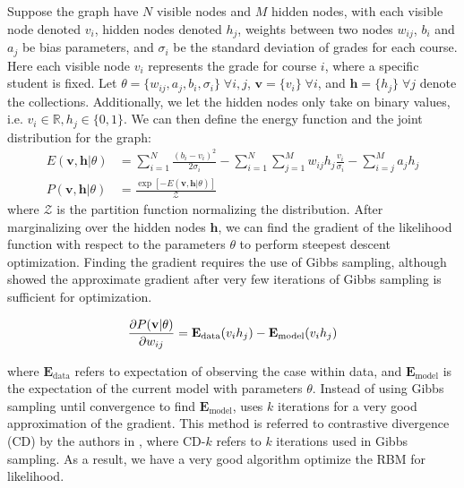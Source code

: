 Suppose the graph have $N$ visible nodes and $M$ hidden nodes,
with each visible node denoted $v_i$, hidden nodes denoted $h_j$, 
weights between two nodes $w_{ij}$,
$b_i$ and $a_j$ be bias parameters,
and $\sigma_i$ be the standard deviation of grades for each course.
Here each visible node $v_i$ represents the grade for course $i$,
where a specific student is fixed.
Let $\theta = \{ w_{ij},a_j,b_i,\sigma_i \} \; \forall i,j$,
$\mathbf{v} = \{v_i\} \; \forall i$,
and $\mathbf{h} = \{h_j\} \; \forall j$ denote the collections.
Additionally, we let the hidden nodes only take on binary values, 
i.e. $v_i \in \mathbb{R}, h_j \in \{0,1\}$.
We can then define the energy function and 
the joint distribution for the graph:
%
\begin{equation}
\begin{aligned}
    E(\mathbf{v},\mathbf{h}|\theta) &= 
        \displaystyle\sum_{i=1}^N \frac{(b_i - v_i)^2}{2 \sigma_i}
        - \displaystyle\sum_{i=1}^N \displaystyle\sum_{j=1}^M
             w_{ij} h_j \frac{v_i}{\sigma_i}
        - \displaystyle\sum_{i=j}^M a_j h_j \\
%
%
    P(\mathbf{v},\mathbf{h}|\theta) &= 
        \frac{\exp\left[-E(\mathbf{v},\mathbf{h}|\theta)\right]}
        {\mathcal{Z}}
\end{aligned}
\end{equation}
%
where $\mathcal{Z}$ is the partition function normalizing
the distribution.
After marginalizing over the hidden nodes $\mathbf{h}$, 
we can find the gradient of the likelihood function
with respect to the parameters $\theta$
to perform steepest descent optimization.
Finding the gradient requires the use of Gibbs sampling,
although \cite{SaMnHi07} showed the approximate gradient
after very few iterations of Gibbs sampling is sufficient 
for optimization.

\begin{equation}
    \frac{\partial P(\mathbf{v}|\theta)}{\partial w_{ij}} = 
        \mathbf{E}_{\text{data}} (v_i h_j) -
        \mathbf{E}_{\text{model}} (v_i h_j)
\end{equation}

where $\mathbf{E}_{\text{data}}$ refers to expectation 
of observing the case within data,
and $\mathbf{E}_{\text{model}}$ is the expectation of 
the current model with parameters $\theta$.
Instead of using Gibbs sampling until convergence to find 
$\mathbf{E}_{\text{model}}$, 
\cite{SaMnHi07} uses $k$ iterations for a very good approximation
of the gradient.
This method is referred to contrastive divergence (CD) by the 
authors in \cite{SaMnHi07}, where CD-$k$ refers to $k$ iterations
used in Gibbs sampling.
As a result, we have a very good algorithm optimize the
RBM for likelihood.

